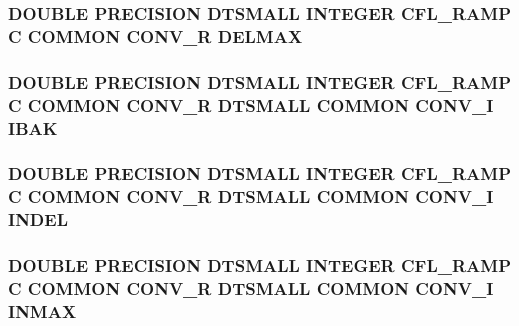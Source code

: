 \hypertarget{conv_8com_a715eab8d5cd0cd49a247520cd432061c}{
\subsubsection[{D\-E\-L\-M\-A\-X}]{\setlength{\rightskip}{0pt plus 5cm}D\-O\-U\-B\-L\-E P\-R\-E\-C\-I\-S\-I\-O\-N D\-T\-S\-M\-A\-L\-L I\-N\-T\-E\-G\-E\-R C\-F\-L\-\_\-\-R\-A\-M\-P C C\-O\-M\-M\-O\-N C\-O\-N\-V\-\_\-\-R D\-E\-L\-M\-A\-X}}\label{conv_8com_a715eab8d5cd0cd49a247520cd432061c}
\hypertarget{conv_8com_aab06481a8652a66f0849ac8bba3eadca}{
\subsubsection[{I\-B\-A\-K}]{\setlength{\rightskip}{0pt plus 5cm}D\-O\-U\-B\-L\-E P\-R\-E\-C\-I\-S\-I\-O\-N D\-T\-S\-M\-A\-L\-L I\-N\-T\-E\-G\-E\-R C\-F\-L\-\_\-\-R\-A\-M\-P C C\-O\-M\-M\-O\-N C\-O\-N\-V\-\_\-\-R D\-T\-S\-M\-A\-L\-L C\-O\-M\-M\-O\-N C\-O\-N\-V\-\_\-\-I I\-B\-A\-K}}\label{conv_8com_aab06481a8652a66f0849ac8bba3eadca}
\hypertarget{conv_8com_af687d75faa87ba22ebd22f23d1d75cf2}{
\subsubsection[{I\-N\-D\-E\-L}]{\setlength{\rightskip}{0pt plus 5cm}D\-O\-U\-B\-L\-E P\-R\-E\-C\-I\-S\-I\-O\-N D\-T\-S\-M\-A\-L\-L I\-N\-T\-E\-G\-E\-R C\-F\-L\-\_\-\-R\-A\-M\-P C C\-O\-M\-M\-O\-N C\-O\-N\-V\-\_\-\-R D\-T\-S\-M\-A\-L\-L C\-O\-M\-M\-O\-N C\-O\-N\-V\-\_\-\-I I\-N\-D\-E\-L}}\label{conv_8com_af687d75faa87ba22ebd22f23d1d75cf2}
\hypertarget{conv_8com_ae1a2f506c87687fe1a93649abac3846a}{
\subsubsection[{I\-N\-M\-A\-X}]{\setlength{\rightskip}{0pt plus 5cm}D\-O\-U\-B\-L\-E P\-R\-E\-C\-I\-S\-I\-O\-N D\-T\-S\-M\-A\-L\-L I\-N\-T\-E\-G\-E\-R C\-F\-L\-\_\-\-R\-A\-M\-P C C\-O\-M\-M\-O\-N C\-O\-N\-V\-\_\-\-R D\-T\-S\-M\-A\-L\-L C\-O\-M\-M\-O\-N C\-O\-N\-V\-\_\-\-I I\-N\-M\-A\-X}}\label{conv_8com_ae1a2f506c87687fe1a93649abac3846a}

